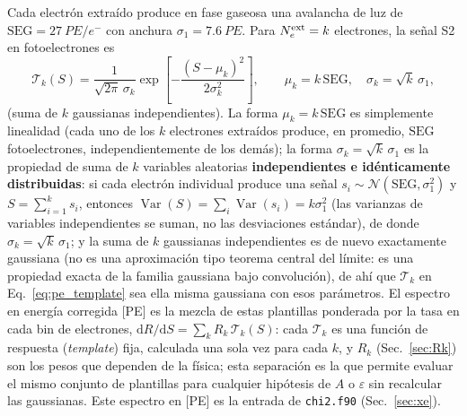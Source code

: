 \documentclass[11pt,a4paper]{article}
\newcommand{\eps}{\varepsilon}
\newcommand{\Ne}{N_{e}}
\newcommand{\code}[1]{\texttt{#1}}
\newcommand{\dd}{\mathrm{d}}
\begin{document}
Cada electr\'on extra\'ido produce en fase gaseosa una avalancha de luz de
$\mathrm{SEG}=\SI{27}{PE/e^{-}}$ con anchura $\sigma_{1}=\SI{7.6}{PE}$. Para
$\Ne^{\rm ext}=k$ electrones, la se\~nal S2 en fotoelectrones es
\begin{equation}
  \label{eq:pe_template}
  \mathcal{T}_{k}(S)
  = \frac{1}{\sqrt{2\pi}\,\sigma_{k}}
    \exp\!\left[-\frac{(S-\mu_{k})^{2}}{2\sigma_{k}^{2}}\right],
  \qquad
  \mu_{k} = k\,\mathrm{SEG},\quad
  \sigma_{k} = \sqrt{k}\,\sigma_{1},
\end{equation}
(suma de $k$ gaussianas independientes). La forma $\mu_{k}=k\,\mathrm{SEG}$ es
simplemente linealidad (cada uno de los $k$ electrones extra\'idos produce, en
promedio, $\mathrm{SEG}$ fotoelectrones, independientemente de los dem\'as); la
forma $\sigma_{k}=\sqrt{k}\,\sigma_{1}$ es la propiedad de suma de $k$ variables
aleatorias \textbf{independientes e id\'enticamente distribuidas}: si cada
electr\'on individual produce una se\~nal $s_{i}\sim\mathcal{N}(\mathrm{SEG},
\sigma_{1}^{2})$ y $S=\sum_{i=1}^{k}s_{i}$, entonces
$\operatorname{Var}(S)=\sum_{i}\operatorname{Var}(s_{i})=k\sigma_{1}^{2}$
(las varianzas de variables independientes se suman, no las desviaciones
est\'andar), de donde $\sigma_{k}=\sqrt{k}\,\sigma_{1}$; y la suma de $k$
gaussianas independientes es de nuevo exactamente gaussiana (no es una
aproximaci\'on tipo teorema central del l\'imite: es una propiedad exacta de la
familia gaussiana bajo convoluci\'on), de ah\'i que $\mathcal{T}_{k}$ en
Eq.~\eqref{eq:pe_template} sea ella misma gaussiana con esos par\'ametros. El
espectro en energ\'ia corregida [PE] es la mezcla de estas plantillas ponderada
por la tasa en cada bin de electrones,
$\dd R/\dd S = \sum_{k} R_{k}\,\mathcal{T}_{k}(S)$: cada $\mathcal{T}_{k}$ es una
funci\'on de respuesta (\emph{template}) fija, calculada una sola vez para cada
$k$, y $R_{k}$ (Sec.~\ref{sec:Rk}) son los pesos que dependen de la f\'isica; esta
separaci\'on es la que permite evaluar el mismo conjunto de plantillas para
cualquier hip\'otesis de $A$ o $\eps$ sin recalcular las gaussianas. Este
espectro en [PE] es la entrada de \code{chi2.f90} (Sec.~\ref{sec:xe}).
\end{document}
